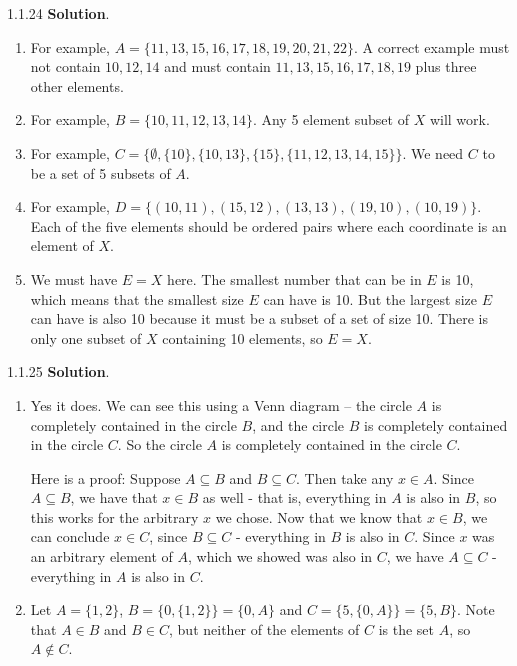 \documentclass[11pt,]{book}
\theoremstyle{ptxplainnotitle}
\theoremstyle{ptxplaintitle}
\theoremstyle{ptxdefinitionnotitle}
\theoremstyle{ptxdefinitiontitle}
\theoremstyle{ptxdefinitionnotitle}
\theoremstyle{ptxdefinitiontitle}
\theoremstyle{ptxdefinitionnotitle}
\theoremstyle{ptxdefinitiontitle}
\theoremstyle{ptxdefinitiontitlenonumber}
\theoremstyle{ptxdefinitiontitlenonumber}
\numberwithin{equation}{chapter}
\begin{document}
\begin{divisionexercise}{1.1.24}
\textbf{Solution}.\quad%
\hypertarget{p-1011}{}%
\leavevmode%
\begin{enumerate}[label=(\alph*)]
\item\hypertarget{li-450}{}\hypertarget{p-1012}{}%
For example, \(A = \{11, 13, 15, 16, 17, 18, 19, 20, 21, 22\}\).  A correct example must not contain \(10, 12, 14\) and must contain \(11, 13, 15, 16, 17, 18, 19\) plus three other elements.%
\item\hypertarget{li-451}{}\hypertarget{p-1013}{}%
For example, \(B = \{10, 11, 12, 13, 14\}\).  Any 5 element subset of \(X\) will work.%
\item\hypertarget{li-452}{}\hypertarget{p-1014}{}%
For example, \(C = \{\emptyset, \{10\}, \{10, 13\}, \{15\}, \{11, 12, 13, 14, 15\}\}\).  We need \(C\) to be a set of 5 subsets of \(A\).%
\item\hypertarget{li-453}{}\hypertarget{p-1015}{}%
For example, \(D = \{(10,11), (15,12), (13,13), (19,10), (10,19)\}\).  Each of the five elements should be ordered pairs where each coordinate is an element of \(X\).%
\item\hypertarget{li-454}{}\hypertarget{p-1016}{}%
We must have \(E = X\) here.  The smallest number that can be in \(E\) is 10, which means that the smallest size \(E\) can have is 10.  But the largest size \(E\) can have is also 10 because it must be a subset of a set of size 10.  There is only one subset of \(X\) containing 10 elements, so \(E = X\).%
\end{enumerate}
%
\end{divisionexercise}%
\begin{divisionexercise}{1.1.25}
\textbf{Solution}.\quad%
\hypertarget{p-1020}{}%
\leavevmode%
\begin{enumerate}[label=(\alph*)]
\item\hypertarget{li-457}{}\hypertarget{p-1021}{}%
Yes it does.  We can see this using a Venn diagram -- the circle \(A\) is completely contained in the circle \(B\), and the circle \(B\) is completely contained in the circle \(C\).  So the circle \(A\) is completely contained in the circle \(C\).%
\par
\hypertarget{p-1022}{}%
Here is a proof: Suppose \(A \subseteq B\) and \(B \subseteq C\).  Then take any \(x \in A\).  Since \(A \subseteq B\), we have that \(x \in B\) as well - that is, everything in \(A\) is also in \(B\), so this works for the arbitrary \(x\) we chose.  Now that we know that \(x \in B\), we can conclude \(x \in C\), since \(B \subseteq C\) - everything in \(B\) is also in \(C\).  Since \(x\) was an arbitrary element of \(A\), which we showed was also in \(C\), we have \(A \subseteq C\) - everything in \(A\) is also in \(C\).%
\item\hypertarget{li-458}{}\hypertarget{p-1023}{}%
Let \(A = \{1,2\}\), \(B = \{0, \{1,2\}\} = \{0, A\}\) and \(C = \{5, \{0, A\}\} = \{5, B\}\).  Note that \(A \in B\) and \(B \in C\), but neither of the elements of \(C\) is the set \(A\), so \(A \notin C\).%
\end{enumerate}
%
\end{divisionexercise}%
\end{document}

